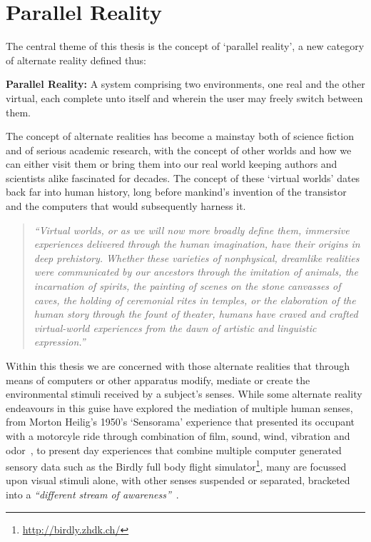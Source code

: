 
\section{Parallel Reality}
\label{intro-parallel-reality}
The central theme of this thesis is the concept of `parallel reality', a new category of alternate reality defined thus:

\vspace{7mm}

\textbf{Parallel Reality:} A system comprising two environments, one real and the other virtual, each complete unto itself and wherein the user may freely switch between them.

\vspace{7mm}


The concept of alternate realities has become a mainstay both of science fiction and of serious academic research, with the concept of other worlds and how we can either visit them or bring them into our real world keeping authors and scientists alike fascinated for decades. The concept of these `virtual worlds' dates back far into human history, long before mankind's invention of the transistor and the computers that would subsequently harness it.

\begin{quote}
	\textit{``Virtual worlds, or as we will now more broadly define them, immersive experiences delivered through the human imagination, have their origins in deep prehistory. Whether these varieties of nonphysical, dreamlike realities were communicated by our ancestors through the imitation of animals, the incarnation of spirits, the painting of scenes on the stone canvasses of caves, the holding of ceremonial rites in temples, or the elaboration of the human story through the fount of theater, humans have craved and crafted virtual-world experiences from the dawn of artistic and linguistic expression.''}~\cite{Damer2014}
\end{quote}

Within this thesis we are concerned with those alternate realities that through means of computers or other apparatus modify, mediate or create the environmental stimuli received by a subject's senses. While some alternate reality endeavours in this guise have explored the mediation of multiple human senses, from Morton Heilig's 1950's `Sensorama' experience that presented its occupant with a motorcyle ride through combination of film, sound, wind, vibration and odor~\cite{Rheingold1992}, to present day experiences that combine multiple computer generated sensory data such as the Birdly full body flight simulator\footnote{\url{http://birdly.zhdk.ch/}}, many are focussed upon visual stimuli alone, with other senses suspended or separated, bracketed into a \textit{``different stream of awareness''}~\cite{Adams2014}.

